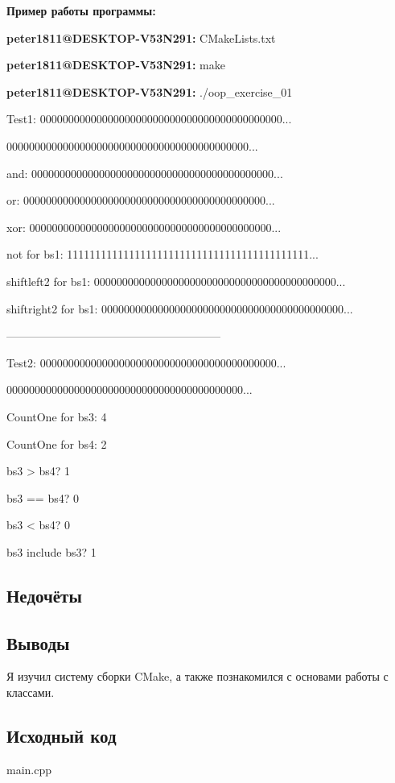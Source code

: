 \documentclass[12pt]{article}
\begin{document}
\begin{left}

\textbf{Пример работы программы: }

\textbf{peter1811@DESKTOP-V53N291:}  CMakeLists.txt
    
\textbf{peter1811@DESKTOP-V53N291:} make
    
\textbf{peter1811@DESKTOP-V53N291:} ./oop\_exercise\_01

Test1:
0000000000000000000000000000000000000000000...

0000000000000000000000000000000000000000000...

and:
0000000000000000000000000000000000000000000...

or:
0000000000000000000000000000000000000000000...

xor:
0000000000000000000000000000000000000000000...

not for bs1:
1111111111111111111111111111111111111111111...

shiftleft2 for bs1:
0000000000000000000000000000000000000000000...

shiftright2 for bs1:
0000000000000000000000000000000000000000000...

---------------------------------------------------------

Test2:
000000000000000000000000000000000000000000...

000000000000000000000000000000000000000000...

CountOne for bs3: 4

CountOne for bs4: 2

bs3 > bs4? 1

bs3 == bs4? 0

bs3 < bs4? 0

bs3 include bs3? 1

\end{left}

\subsection*{Недочёты}


\subsection*{Выводы}

Я изучил систему сборки CMake, а также познакомился с основами работы с классами.


\vfill

\subsection*{Исходный код}

    
{\Huge main.cpp}
\inputminted{C++}{main.cpp}
    \pagebreak
    
\end{document}
